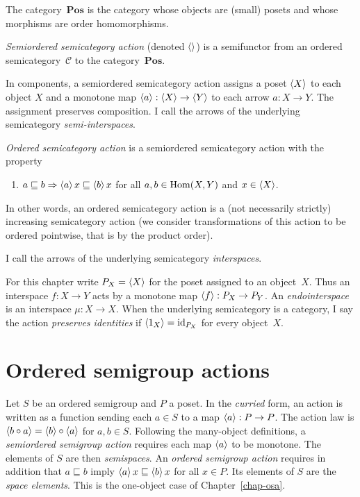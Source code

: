 The category~$\mathbf{Pos}$ is the category whose objects are (small) posets and whose morphisms are order homomorphisms.

\begin{defn}
\emph{Semiordered semicategory action} (denoted $\left\langle \right\rangle$) is a semifunctor from an ordered semicategory~$\mathcal{C}$ to the category~$\mathbf{Pos}$.
\end{defn}

In components, a semiordered semicategory action assigns a poset
$\left\langle X\right\rangle$ to each object $X$ and a monotone map
$\left\langle a\right\rangle:\left\langle X\right\rangle\to\left\langle Y\right\rangle$ to each arrow $a:X\to Y$.
The assignment preserves composition. I call the arrows of the
underlying semicategory \emph{semi-interspaces}.

\begin{defn}
\emph{Ordered semicategory action} is a semiordered semicategory action with the property
\begin{enumerate}
\item $a\sqsubseteq b\Rightarrow\left\langle a\right\rangle x\sqsubseteq\left\langle b\right\rangle x$ for all $a,b\in\operatorname{Hom}(X,Y)$ and $x\in\left\langle X\right\rangle$.
\end{enumerate}
In other words, an ordered semicategory action is a (not necessarily strictly) increasing semicategory action (we consider transformations of this action to be ordered pointwise, that is by the product order).

I call the arrows of the underlying semicategory \emph{interspaces}.
\end{defn}

For this chapter write $P_X=\left\langle X\right\rangle$ for the poset assigned to an
object~$X$. Thus an interspace $f:X\to Y$ acts by a monotone map
$\left\langle f\right\rangle:P_X\to P_Y$. An \emph{endointerspace} is an interspace
$\mu:X\to X$. When the underlying semicategory is a category,
I say the action \emph{preserves identities} if
$\left\langle 1_X\right\rangle={\operatorname{id}}_{P_X}$ for every object~$X$.



\chapter{Ordered semigroup actions}

Let $S$ be an ordered semigroup and $P$ a poset. In the
\emph{curried} form, an action is written as a function sending
each $a\in S$ to a map $\left\langle a\right\rangle:P\to P$. The action law is
$\left\langle b\circ a\right\rangle=\left\langle b\right\rangle\circ\left\langle a\right\rangle$ for $a,b\in S$.
Following the many-object definitions, a \emph{semiordered
semigroup action} requires each map $\left\langle a\right\rangle$ to be monotone.
The elements of $S$ are then \emph{semispaces}. An
\emph{ordered semigroup action} requires in addition that
$a\sqsubseteq b$ imply $\left\langle a\right\rangle x\sqsubseteq\left\langle b\right\rangle x$ for all
$x\in P$. Its elements of $S$ are the \emph{space elements}.
This is the one-object case of Chapter~\ref{chap-osa}.

